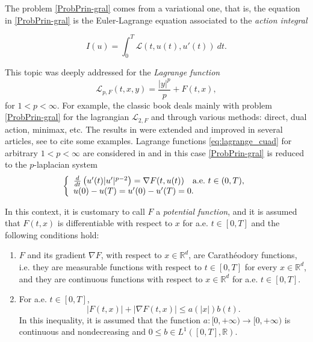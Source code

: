 \documentclass[twoside]{article}
\makeatletter
\theoremstyle{remark}
\newcommand{\labitem}[2]{%
\def\@itemlabel{\textbf{#1}}
\item
\def\@currentlabel{#1}\label{#2}}
\newcommand{\rr}{\mathbb{R}}
\renewcommand{\leq}{\leqslant}
\newcounter{example}
\makeatother
\begin{document}
The problem \eqref{ProbPrin-gral} comes from a variational one, that is,  the equation in  \eqref{ProbPrin-gral} is the Euler-Lagrange equation associated to the \emph{action integral}

\begin{equation}\label{integral_accion}
I(u)=\int_{0}^T \mathcal{L}(t,u(t),u'(t))\ dt.
\end{equation}




This topic was deeply addressed for the \emph{Lagrange function}
\begin{equation}\label{eq:lagrange_cuad}
\mathcal{L}_{p,F}(t,x,y)=\frac{|y|^p}{p}+F(t,x),
\end{equation}
for $1<p<\infty$. For example, the classic book  \cite{mawhin2010critical} deals mainly with problem \eqref{ProbPrin-gral} for the lagrangian $\mathcal{L}_{2,F}$ and through various methods: direct, dual action, minimax, etc. The results in \cite{mawhin2010critical} were extended and improved in several articles, see  \cite{tang1995periodic,tang1998periodic,wu1999periodic,tang2001periodic,zhao2004periodic}  to cite some examples. Lagrange functions \eqref{eq:lagrange_cuad} for arbitrary $1<p<\infty$ are considered in  \cite{Tian2007192,tang2010periodic} and in this case \eqref{ProbPrin-gral}  is reduced to the $p$-laplacian system
\begin{equation*}\label{ProbP-lapla}
    \left\{%
\begin{array}{ll}
   \frac{d}{dt}\left(u'(t)|u'|^{p-2}\right) = \nabla F(t,u(t)) \quad \hbox{a.e.}\ t \in (0,T),\\
    u(0)-u(T)=u'(0)-u'(T)=0.
\end{array}%
\right.
\end{equation*}


In this context, it  is customary to call $F$ a  \emph{potential function}, and it is assumed that $F(t,x)$ is differentiable with respect to $x$ for a.e. $t\in [0,T]$ and the following conditions hold:
\begin{enumerate}
\labitem{(C)}{item:condicion_c} $F$ and its gradient $\nabla F$, with respect to $x\in\rr^d$,  are  Carath\'eodory functions, i.e. they are measurable functions with respect to $t\in [0,T]$ for every  $x\in\rr^d$, and they are continuous functions with  respect to  $x\in\rr^d$ for a.e. $t \in [0,T]$.
 \labitem{(A)}{item:condicion_a}  For   a.e. $t\in [0,T]$, 
\begin{equation}
|F(t,x)| + |\nabla F(t,x)|  \leq a(|x|)b(t).
\end{equation}
In this inequality, it is assumed that the function  $a:[0,+\infty)\to [0,+\infty)$ is continuous and nondecreasing and $0\leq b\in L^1([0,T],\rr)$.
\end{enumerate}
\end{document}
